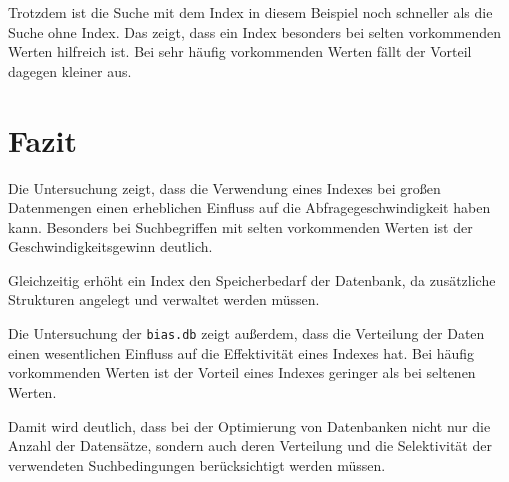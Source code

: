\documentclass{article}
\begin{document}
Trotzdem ist die Suche mit dem Index in diesem Beispiel noch schneller
als die Suche ohne Index. Das zeigt, dass ein Index besonders bei
selten vorkommenden Werten hilfreich ist. Bei sehr häufig vorkommenden
Werten fällt der Vorteil dagegen kleiner aus.


\section{Fazit}

Die Untersuchung zeigt, dass die Verwendung eines Indexes bei großen
Datenmengen einen erheblichen Einfluss auf die Abfragegeschwindigkeit
haben kann. Besonders bei Suchbegriffen 
mit selten vorkommenden Werten ist der Geschwindigkeitsgewinn deutlich.

Gleichzeitig erhöht ein Index den Speicherbedarf der Datenbank, da
zusätzliche Strukturen angelegt und verwaltet werden müssen.

Die Untersuchung der \texttt{bias.db} zeigt außerdem, dass die
Verteilung der Daten einen wesentlichen Einfluss auf die Effektivität
eines Indexes hat. Bei häufig vorkommenden Werten ist der Vorteil eines
Indexes geringer als bei seltenen Werten.

Damit wird deutlich, dass bei der Optimierung von Datenbanken nicht
nur die Anzahl der Datensätze, sondern auch deren Verteilung und die
Selektivität der verwendeten Suchbedingungen berücksichtigt werden
müssen.
\end{document}
